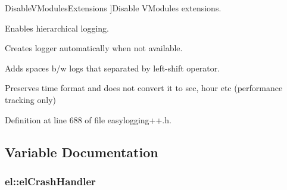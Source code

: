 \begin{Desc}
\begin{description}
{\hypertarget{namespaceel_a2784aacd04cb7816ac1c0b20fcbf83cba18a8e65b84ca0cc82451b5e155d7aeb4}{}Disable\+V\+Modules\+Extensions\label{namespaceel_a2784aacd04cb7816ac1c0b20fcbf83cba18a8e65b84ca0cc82451b5e155d7aeb4}
}]Disable V\+Modules extensions. \item[{\em 
\hypertarget{namespaceel_a2784aacd04cb7816ac1c0b20fcbf83cba477de0500d7a5b64a4500d82811fc058}{}Hierarchical\+Logging\label{namespaceel_a2784aacd04cb7816ac1c0b20fcbf83cba477de0500d7a5b64a4500d82811fc058}
}]Enables hierarchical logging. \item[{\em 
\hypertarget{namespaceel_a2784aacd04cb7816ac1c0b20fcbf83cba2afa5afe77105aadedcbb90dd8547cc3}{}Create\+Logger\+Automatically\label{namespaceel_a2784aacd04cb7816ac1c0b20fcbf83cba2afa5afe77105aadedcbb90dd8547cc3}
}]Creates logger automatically when not available. \item[{\em 
\hypertarget{namespaceel_a2784aacd04cb7816ac1c0b20fcbf83cba34620f140246d3c3b68c17fdf7b8ada7}{}Auto\+Spacing\label{namespaceel_a2784aacd04cb7816ac1c0b20fcbf83cba34620f140246d3c3b68c17fdf7b8ada7}
}]Adds spaces b/w logs that separated by left-\/shift operator. \item[{\em 
\hypertarget{namespaceel_a2784aacd04cb7816ac1c0b20fcbf83cbaebbb601e28e0cf821dfe13b4a7cf409e}{}Fixed\+Time\+Format\label{namespaceel_a2784aacd04cb7816ac1c0b20fcbf83cbaebbb601e28e0cf821dfe13b4a7cf409e}
}]Preserves time format and does not convert it to sec, hour etc (performance tracking only) \end{description}
\end{Desc}


Definition at line 688 of file easylogging++.\+h.



\subsection{Variable Documentation}
\hypertarget{namespaceel_ab9770514f33aef6683dbba37be2b471d}{}
\subsubsection[{el\+Crash\+Handler}]{ el\+::el\+Crash\+Handler}\label{namespaceel_ab9770514f33aef6683dbba37be2b471d}
